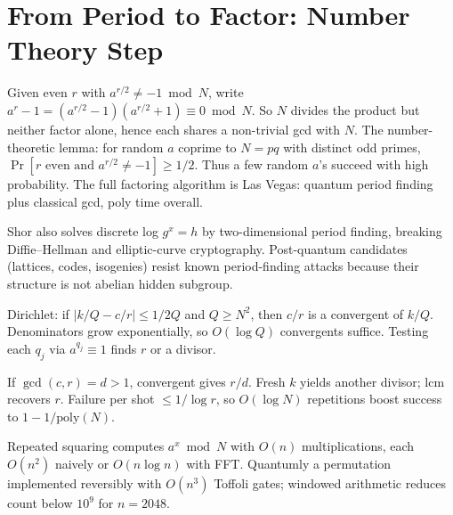 \section{From Period to Factor: Number Theory Step}
Given even $r$ with $a^{r/2}\neq-1\bmod N$, write $a^r-1=(a^{r/2}-1)(a^{r/2}+1)\equiv0\bmod N$. So $N$ divides the product but neither factor alone, hence each shares a non-trivial gcd with $N$. The number-theoretic lemma: for random $a$ coprime to $N=pq$ with distinct odd primes, $\Pr[r\text{ even and }a^{r/2}\neq-1]\ge1/2$. Thus a few random $a$'s succeed with high probability. The full factoring algorithm is Las Vegas: quantum period finding plus classical gcd, poly time overall.

\begin{remark}
Shor also solves discrete log $g^x=h$ by two-dimensional period finding, breaking Diffie--Hellman and elliptic-curve cryptography. Post-quantum candidates (lattices, codes, isogenies) resist known period-finding attacks because their structure is not abelian hidden subgroup.
\end{remark}


\begin{remark}
Dirichlet: if $|k/Q-c/r|\le1/2Q$ and $Q\ge N^2$, then $c/r$ is a convergent of $k/Q$. Denominators grow exponentially, so $O(\log Q)$ convergents suffice. Testing each $q_j$ via $a^{q_j}\equiv1$ finds $r$ or a divisor.
\end{remark}

\begin{example}
If $\gcd(c,r)=d>1$, convergent gives $r/d$. Fresh $k$ yields another divisor; $\mathrm{lcm}$ recovers $r$. Failure per shot $\le1/\log r$, so $O(\log N)$ repetitions boost success to $1-1/\mathrm{poly}(N)$.
\end{example}

\begin{remark}
Repeated squaring computes $a^x\bmod N$ with $O(n)$ multiplications, each $O(n^2)$ naively or $O(n\log n)$ with FFT. Quantumly a permutation implemented reversibly with $O(n^3)$ Toffoli gates; windowed arithmetic reduces count below $10^9$ for $n=2048$.
\end{remark}


